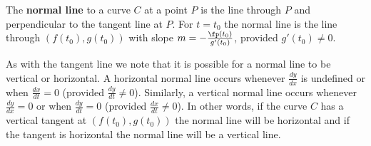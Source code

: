 \begin{definition}\label{def:normal_par}
The \textbf{normal line} to a curve $C$ at a point $P$ is the line through $P$ and perpendicular to the tangent line at $P$. For $t=t_0$ the normal line is the line through $(f(t_0), g(t_0))$ with slope $m=-\frac{\fp(t_0)}{g'(t_0)}$, provided $g'(t_0) \neq 0$.
\end{definition}

As with the tangent line we note that it is possible for a normal line to be vertical or horizontal. A horizontal normal line occurs whenever $\frac{dy}{dx}$ is undefined or when $\frac{dx}{dt} = 0$ (provided $\frac{dy}{dt} \neq 0$). Similarly, a vertical normal line occurs whenever $\frac{dy}{dx} = 0$ or when $\frac{dy}{dt} = 0$ (provided $\frac{dx}{dt} \neq 0$). In other words, if the curve $C$ has a vertical tangent  at $(f(t_0), g(t_0))$ the normal line will be horizontal and if the tangent is horizontal the normal line will be a vertical line.


